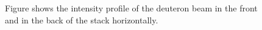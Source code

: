 \begin{figure}%
    \centering
    
    \quad
    \caption{Figure shows the intensity profile of the deuteron beam in the front and in the back of the stack horizontally.}%
    \label{fig:beamprofile}%
\end{figure}

